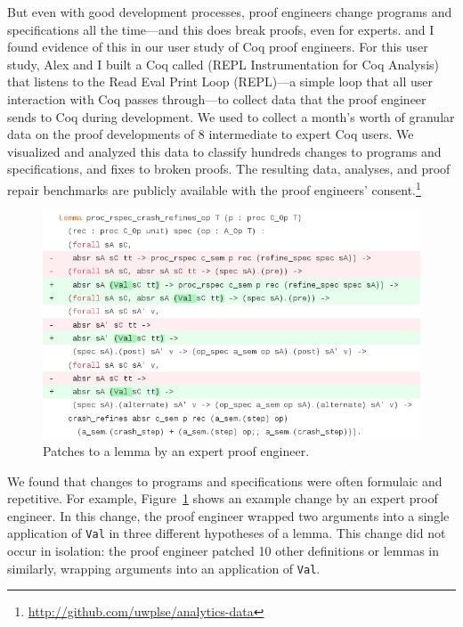 But even with good development processes, proof engineers change programs and specifications all the time---and this does break proofs, 
even for experts.
 and I found evidence of this in our user study of Coq proof engineers.
For this user study, Alex and I built a Coq  called 
(REPL Instrumentation for Coq Analysis) that listens to the Read Eval Print
Loop (REPL)---a simple loop that all user interaction with Coq passes through---to collect data that the proof engineer sends to Coq during development.
We used \toolname to collect a month's worth of granular data on 
the proof developments of 8 intermediate to expert Coq users.
We visualized and analyzed this data to classify hundreds changes to programs and specifications,
and fixes to broken proofs.
The resulting data, analyses, and proof repair benchmarks are publicly available with the proof engineers' 
consent.\footnote{\url{http://github.com/uwplse/analytics-data}}

\begin{figure}
  \includegraphics[width=1.0\textwidth]{maintenance/fig/patch.png}
  \caption{Patches to a lemma by an expert proof engineer.}
  \label{fig:patch}
\end{figure}

We found that changes to programs and specifications were often formulaic and repetitive.
For example, Figure~\ref{fig:patch} shows an example change by an expert proof engineer.
In this change, the proof engineer wrapped two arguments into a single application of \lstinline{Val}
in three different hypotheses of a lemma.
This change did not occur in isolation: the proof engineer patched 10 other definitions or lemmas
in similarly, wrapping arguments into an application of
\lstinline{Val}.

